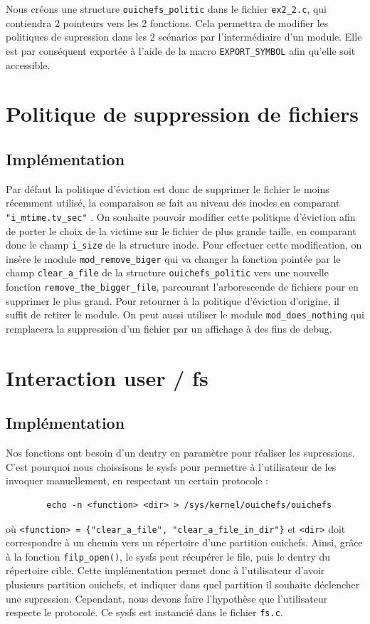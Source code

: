 \documentclass{article}
\begin{document}
	
	Nous créons une structure \verb|ouichefs_politic| dans le fichier \verb|ex2_2.c|, qui contiendra 2 pointeurs vers les 2 fonctions. Cela permettra de modifier les politiques de supression dans les 2 scénarios par l'intermédiaire d'un module. Elle est par conséquent exportée à l'aide de la macro \verb|EXPORT_SYMBOL| afin qu'elle soit accessible.

	\section{Politique de suppression de fichiers}
	\subsection{Implémentation}
	Par défaut la politique d'éviction est donc de supprimer le fichier le moins récemment utilisé,  la comparaison se fait au niveau des inodes en comparant \verb|"i_mtime.tv_sec"| .\newline
	On souhaite pouvoir modifier cette politique d'éviction afin de porter le choix de la victime sur le fichier de plus grande taille, en comparant donc le champ \verb|i_size| de la structure inode.\newline
	Pour effectuer cette modification, on insère le module \verb|mod_remove_biger| qui va changer la fonction pointée par le champ \verb|clear_a_file| de la structure \verb|ouichefs_politic| vers une nouvelle fonction \verb|remove_the_bigger_file|, parcourant l'arborescende de fichiers pour en supprimer le plus grand.\newline
	Pour retourner à la politique d'éviction d'origine, il suffit de retirer le module.\newline
	On peut aussi utiliser le module \verb|mod_does_nothing| qui remplacera la suppression d'un fichier par un affichage à des fins de debug.
	
	\section{Interaction user / fs}
	\subsection{Implémentation}
	Nos fonctions ont besoin d'un dentry en paramètre pour réaliser les supressions. C'est pourquoi nous choissisons le sysfs pour permettre à l'utilisateur de les invoquer manuellement, en respectant un certain protocole : 
	\begin{lstlisting}
    	echo -n <function> <dir> > /sys/kernel/ouichefs/ouichefs
	\end{lstlisting}
    où \verb|<function> = {"clear_a_file", "clear_a_file_in_dir"}| et \verb|<dir>| doit correspondre à un chemin vers un répertoire d'une partition ouichefs. Ainsi, grâce à la fonction \verb|filp_open()|, le sysfs peut récupérer le file, puis le dentry du répertoire cible. Cette implémentation permet donc à l'utilisateur d'avoir plusieurs partition ouichefs, et indiquer dans quel partition il souhaite déclencher une supression. Cependant, nous devons faire l'hypothèse que l'utilisateur respecte le protocole.
    Ce sysfs est instancié dans le fichier \verb|fs.c|. 
\end{document}
